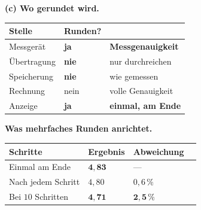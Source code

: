 \begin{aufgabe}
\begin{center}
\end{center}

\medskip
\textbf{(c) Wo gerundet wird.}

\begin{center}
{\small
\renewcommand{\arraystretch}{1.5}
\begin{tabular}{@{}P{2.8cm}P{2.0cm}P{3.0cm}@{}}
\toprule
\textbf{Stelle} & \textbf{Runden?} & \\
\midrule
Messgerät & \textcolor{gruen}{\textbf{ja}} & \textbf{Messgenauigkeit}\\
Übertragung & \textcolor{akzent}{\textbf{nie}} & \textcolor{akzent}{nur durchreichen}\\
Speicherung & \textcolor{akzent}{\textbf{nie}} & \textcolor{gruen}{wie gemessen}\\
Rechnung & \textcolor{akzent}{nein} & \textcolor{gruen}{volle Genauigkeit}\\
Anzeige & \textcolor{gruen}{\textbf{ja}} & \textcolor{gruen}{\textbf{einmal, am Ende}}\\
\bottomrule
\end{tabular}}
\end{center}

\begin{center}
\begin{minipage}{0.88\textwidth}
\end{minipage}
\end{center}

\textbf{Was mehrfaches Runden anrichtet.}

\begin{center}
\renewcommand{\arraystretch}{1.45}
\begin{tabular}{@{}P{2.8cm}P{2.2cm}P{2.4cm}P{1.8cm}@{}}
\toprule
\textbf{Schritte} & \textbf{Ergebnis} & \textbf{Abweichung} & \\
\midrule
Einmal am Ende & $\mathbf{4{,}83}$ & --- & \\
Nach jedem Schritt & $4{,}80$ & $0{,}6\,\%$ & \\
Bei $10$ Schritten & $\mathbf{4{,}71}$ & \textcolor{akzent}{$\mathbf{2{,}5\,\%}$} & \\
\bottomrule
\end{tabular}
\end{center}


\end{aufgabe}
